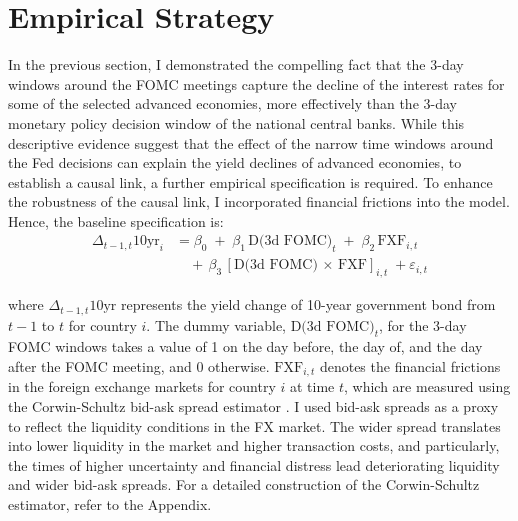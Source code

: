 \section{Empirical Strategy}

In the previous section, I demonstrated the compelling fact that the 3-day windows around the FOMC meetings capture the decline of the interest rates for some of the selected advanced economies, more effectively than the 3-day monetary policy decision window of the national central banks. While this descriptive evidence suggest that the effect of the narrow time windows around the Fed decisions can explain the yield declines of advanced economies, to establish a causal link, a further empirical specification is required. To enhance the robustness of the causal link, I incorporated financial frictions into the model. Hence, the baseline specification is:
$$
\begin{aligned}
\Delta_{t-1,t}10\textrm{yr}_i &= \beta_0\;+\;\beta_1\,\textrm{D(3d FOMC)}_t\;+\;\beta_2\, \textrm{FXF}_{i,t} \\&\quad +\,\beta_3 \, [\textrm{D(3d FOMC})\,\times\,\textrm{FXF}]_{i,t}\;+ \varepsilon_{i,t}
\end{aligned}
$$
\vspace{-0.25cm}

\noindent where $\Delta_{t-1,t}10\textrm{yr}$ represents the yield change of 10-year government bond from $t-1$ to $t$ for country $i$. The dummy variable, $\textrm{D(3d FOMC)}_t$, for the 3-day FOMC windows takes a value of 1 on the day before, the day of, and the day after the FOMC meeting, and 0 otherwise. $\textrm{FXF}_{i,t}$ denotes the financial frictions in the foreign exchange markets for country $i$ at time $t$, which are measured using the Corwin-Schultz bid-ask spread estimator \citep{corwin2012simple}. I used bid-ask spreads as a proxy to reflect the liquidity conditions in the FX market. The wider spread translates into lower liquidity in the market and higher transaction costs, and particularly, the times of higher uncertainty and financial distress lead deteriorating liquidity and wider bid-ask spreads. For a detailed construction of the Corwin-Schultz estimator, refer to the Appendix. \\

